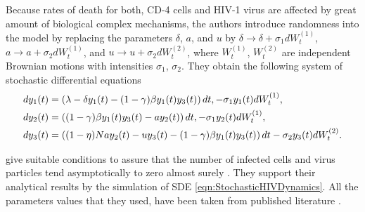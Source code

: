 	Because rates of death for both, CD-4 cells and HIV-1 virus are affected by great amount of biological complex 
mechanisms, the authors introduce randomness into the model by replacing the parameters $\delta$, $a$, and $u$ by
$\delta \to \delta+ \sigma_1 dW^{(1)}_t$,
$a \to a + \sigma_2 dW^{(1)}_t$, and
$u \to u + \sigma_2 dW^{(2)}_t$,
where $W^{(1)}_t$, $W^{(2)}_t$ are independent Brownian motions with intensities $\sigma_1$, $\sigma_2$.
They obtain the following system of stochastic differential equations
\begin{align}\label{eqn:StochasticHIVDynamics}
	dy_1(t) &=
		\left(
			\lambda -\delta y_1(t) - (1 - \gamma) \beta y_1(t) y_3(t)
		\right)dt,
		-\sigma_1 y_1(t) dW^{(1)}_t, 
		\notag \\
	dy_2(t) &= 
		\left(
			(1- \gamma) \beta y_1(t) y_3(t) - a y_2(t) 
		\right)dt,
		-\sigma_1 y_2(t) dW^{(1)}_t, 
	\\
	dy_3(t) & = 
	\left(
		(1 - \eta) N a y_2(t) 
		-u y_3(t)
		-(1 - \gamma ) \beta y_1(t) y_3(t) 
	\right)dt
	- \sigma_2 y_3(t) dW^{(2)}_t.
	\notag
\end{align}

	\citeauthor{Dalal2008} give suitable conditions to assure that  the number of infected cells and virus particles tend
asymptotically to zero almost surely \cite[Thm. 5.1]{Dalal2008}. They support their analytical results by the 
simulation of SDE 
\eqref{eqn:StochasticHIVDynamics}. All the parameters values that they used, have been taken from published 
literature \cite{Bonhoeffer1997, Callaway2002, Nelson2000, Nowak1997}.

